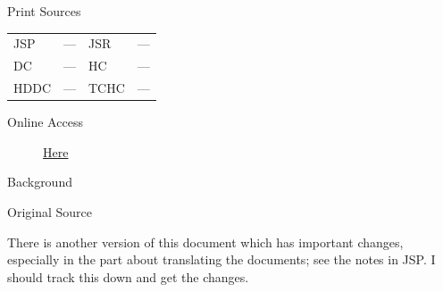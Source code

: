 			\begin{description}
				\item[Print Sources]
			\end{description}

			\begin{tabular}{p{0.5in}p{1in}p{0.5in}p{1in}}
				JSP	 	& ---		& JSR 		& --- \\
				DC	 	& ---		& HC 		& --- \\
				HDDC 	& ---		& TCHC 		& --- \\
			\end{tabular}
			
			\begin{description}
				\item[Online Access] \href{https://www.josephsmithpapers.org/paper-summary/memorial-to-nauvoo-high-council-18-june-1840/1}{Here}
			\end{description}
			
			\begin{description}
				\item[Background]
			\end{description}
			
			
			\begin{description}
				\item[Original Source]
			\end{description}
			
				There is another version of this document which has important changes, especially in the part about translating the documents; see the notes in JSP. I should track this down and get the changes.
			
			
